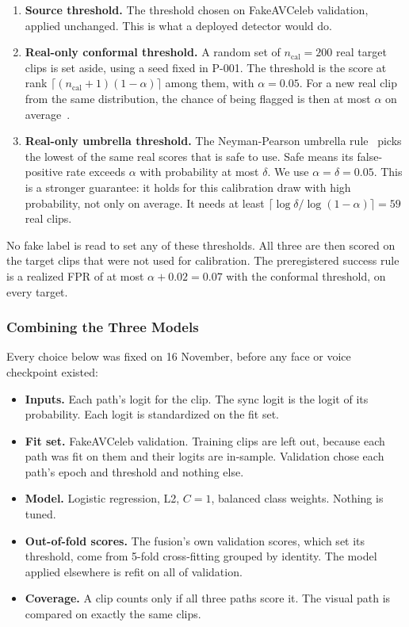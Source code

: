 \begin{enumerate}
    \item \textbf{Source threshold.} The threshold chosen on FakeAVCeleb
    validation, applied unchanged. This is what a deployed detector would do.
    \item \textbf{Real-only conformal threshold.} A random set of
    $n_{\mathrm{cal}} = 200$ real target clips is set aside, using a seed
    fixed in P-001. The threshold is the score at rank
    $\lceil (n_{\mathrm{cal}}+1)(1-\alpha) \rceil$ among them, with
    $\alpha = 0.05$. For a new real clip from the same distribution, the
    chance of being flagged is then at most $\alpha$ on
    average~\cite{bates2023}.
    \item \textbf{Real-only umbrella threshold.} The Neyman-Pearson umbrella
    rule~\cite{tong2018} picks the lowest of the same real scores that is safe
    to use. Safe means its false-positive rate exceeds $\alpha$ with
    probability at most $\delta$. We use $\alpha = \delta = 0.05$. This is a stronger guarantee: it
    holds for this calibration draw with high probability, not only on
    average. It needs at least $\lceil \log\delta / \log(1-\alpha) \rceil = 59$
    real clips.
\end{enumerate}

No fake label is read to set any of these thresholds. All three are then
scored on the target clips that were not used for calibration. The
preregistered success rule is a realized FPR of at most $\alpha + 0.02 = 0.07$
with the conformal threshold, on every target.

\subsubsection{Combining the Three Models}

Every choice below was fixed on 16 November, before any face or voice checkpoint existed:

\begin{itemize}
    \item \textbf{Inputs.} Each path's logit for the clip. The sync logit is the
    logit of its probability. Each logit is standardized on the fit set.
    \item \textbf{Fit set.} FakeAVCeleb validation. Training clips are left out,
    because each path was fit on them and their logits are in-sample.
    Validation chose each path's epoch and threshold and nothing else.
    \item \textbf{Model.} Logistic regression, L2, $C = 1$, balanced class
    weights. Nothing is tuned.
    \item \textbf{Out-of-fold scores.} The fusion's own validation scores, which
    set its threshold, come from 5-fold cross-fitting grouped by identity. The
    model applied elsewhere is refit on all of validation.
    \item \textbf{Coverage.} A clip counts only if all three paths score it. The
    visual path is compared on exactly the same clips.
\end{itemize}

